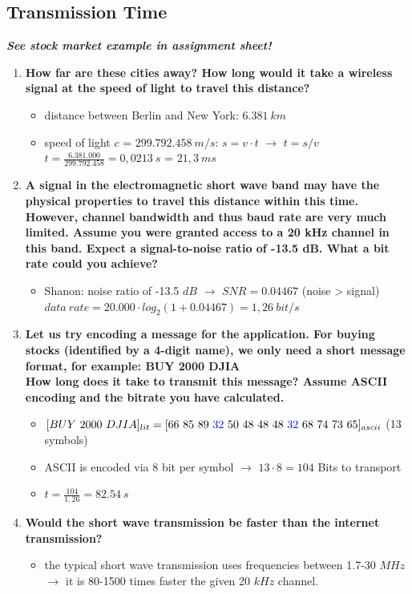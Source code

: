 \documentclass[a4paper,12pt]{article}
\begin{document}
	\subsection{Transmission Time}
	\textbf{\textit{See stock market example in assignment sheet!}}
	\begin{enumerate}[label=(\roman*),itemsep=0pt]
		\item \textbf{How far are these cities away?  How long would it take a wireless signal at the speed of light
			to travel this distance?}
		\begin{itemize}
			\item distance between Berlin and New York: $6.381 ~km$
			\item speed of light $c$ = $299.792.458 ~m/s$: $s = v \cdot t$ $\rightarrow$ $t = s / v $ \\
			$t = \frac{6.381.000}{299.792.458} = 0,0213 ~s$ = $21,3 ~ms$
		\end{itemize}
		\item \textbf{A signal in the electromagnetic short wave band may have the physical properties to travel this distance within this time.  However, channel bandwidth and thus baud rate are very much limited.  Assume you were granted access to a 20 kHz channel in this band. Expect a signal-to-noise ratio of -13.5 dB. What a bit rate could you achieve?}
		\begin{itemize}
			\item Shanon: noise ratio of -13.5 $dB$ $\rightarrow$ $SNR = 0.04467$ (noise > signal)\\
			$data~rate = 20.000 \cdot log_2( 1+ 0.04467) = 1,26 ~bit/s$
		\end{itemize}
		\item \textbf{Let us try encoding a message for the application. For buying stocks (identified by a 4-digit name), we only need a short message format, for example:  {\large BUY 2000 DJIA}\\
		How long does it take to transmit this message? Assume ASCII encoding and the bitrate you have calculated.}
		\begin{itemize}
			\item $[BUY~2000~DJIA]_{lit} = [66~85~89~\textcolor{blue}{32}~50~48~48~48~\textcolor{blue}{32}~68~74~73~65]_{ascii}$ (13 symbols)
			\item ASCII is encoded via 8 bit per symbol $\rightarrow$ $13 \cdot 8 = 104$ Bits to transport
			\item $t = \frac{104}{1,26} = 82.54~s$
		\end{itemize}
		\item \textbf{Would the short wave transmission be faster than the internet transmission?}
		\begin{itemize}
			\item the typical short wave transmission uses frequencies between  1.7-30 $MHz$  $\rightarrow$ it is 80-1500 times faster the given 20 $kHz$ channel.
		\end{itemize}
	\end{enumerate}
	
	
	
\end{document}
